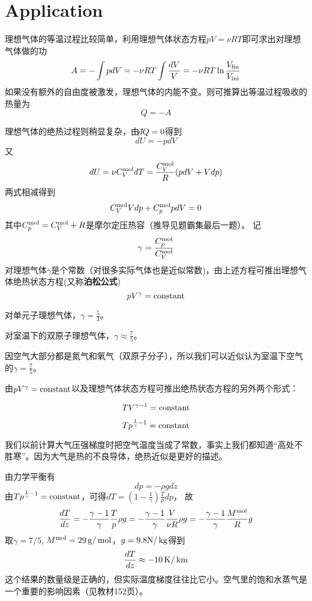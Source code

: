 \documentclass[CJK]{beamer}
\begin{document}
\section{Application}
\begin{frame}
\bch
理想气体的等温过程比较简单，利用理想气体状态方程$pV = \nu RT$即可求出对理想气体做的功
$$ A = -\int p dV = -\nu R T \int \frac{dV}{V} =- \nu R T\ln\frac{V_{\rm fin}}{V_{\rm ini}}$$
如果没有额外的自由度被激发，理想气体的内能不变。则可推算出等温过程吸收的热量为
$$ Q = - A $$
\ech
\end{frame}


\begin{frame}
\bch
{\small
理想气体的绝热过程则稍显复杂，由$\dbar Q=0$得到
$$ dU = -p dV$$
又$$ dU = \nu C_V^{\rm mol} dT = \frac{C_V^{\rm mol}}{R}(p dV + V dp)$$
两式相减得到
$$ C_V^{\rm mol} Vdp + C_p^{\rm mol} p dV = 0$$
其中$C_p^{\rm mol} = C_V^{\rm mol} + R$是摩尔定压热容（推导见题霸集最后一题）。
记$$\gamma = \frac{C_p^{\rm mol}}{C_V^{\rm mol}}$$
对理想气体$\gamma$是个常数（对很多实际气体也是近似常数)，由上述方程可推出{\blue 理想气体绝热状态方程}(又称{\bf 泊松公式})
{\blue 
$$p V^\gamma = \mathrm{constant}$$}
}
\ech
\end{frame}


\begin{frame}
\bch
{\small
对单元子理想气体，$\gamma = \frac{5}{3}$。

\skipline

对室温下的双原子理想气体，$\gamma \approx \frac{7}{5}$。

\skipline

因空气大部分都是氮气和氧气（双原子分子），所以我们可以近似认为室温下空气的$\gamma = \frac{7}{5}$。
}

由$pV^\gamma = \mathrm{constant} $以及理想气体状态方程可推出绝热状态方程的另外两个形式：

$$ TV^{\gamma-1} = \mathrm{constant}$$

$$T p^{\frac{1}{\gamma}-1} = \mathrm{constant} $$
\ech
\end{frame}


\begin{frame}
\bch
{\small 
我们以前计算大气压强梯度时把空气温度当成了常数，事实上我们都知道“高处不胜寒”。因为大气是热的不良导体，绝热近似是更好的描述。

由力学平衡有
$$dp = -\rho g dz$$
由$Tp^{\frac{1}{\gamma}-1}= \mathrm{constant}$，可得$dT = \left(1-\frac{1}{\gamma}\right)\frac{T}{p} dp $，
故
$$\frac{dT}{dz} = -\frac{\gamma - 1}{\gamma} \frac{T}{p}\rho g= -\frac{\gamma - 1}{\gamma} \frac{V}{\nu R}\rho g =  -\frac{\gamma - 1}{\gamma} \frac{M^{\rm mol}}{ R} g$$
取$\gamma  = 7/5$, $M^{\rm mol} = 29\,\mathrm{g}/\,\mathrm{mol}$，$g = 9.8 \mathrm{N}/\,\mathrm{kg}$得到
$$\frac{dT}{dz} \approx -10\,\mathrm{K}/\,\mathrm{km}$$
这个结果的数量级是正确的，但实际温度梯度往往比它小。空气里的饱和水蒸气是一个重要的影响因素（见教材152页）。
}
\ech
\end{frame}
\end{document}
